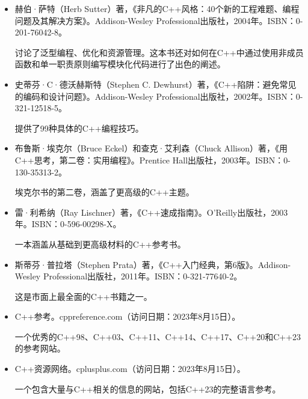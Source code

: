 \begin{itemize}
\item
赫伯·萨特（Herb Sutter）著，《非凡的C++风格：40个新的工程难题、编程问题及其解决方案》。Addison-Wesley Professional出版社，2004年。ISBN：0-201-76042-8。

\hspace*{\fill}

讨论了泛型编程、优化和资源管理。这本书还对如何在C++中通过使用非成员函数和单一职责原则编写模块化代码进行了出色的阐述。

\hspace*{\fill}

\item
史蒂芬·C·德沃赫斯特（Stephen C. Dewhurst）著，《C++陷阱：避免常见的编码和设计问题》。Addison-Wesley Professional出版社，2002年。ISBN：0-321-12518-5。

\hspace*{\fill}

提供了99种具体的C++编程技巧。

\hspace*{\fill}

\item
布鲁斯·埃克尔（Bruce Eckel）和查克·艾利森（Chuck Allison）著，《用C++思考，第二卷：实用编程》。Prentice Hall出版社，2003年。ISBN：0-130-35313-2。

\hspace*{\fill}

埃克尔书的第二卷，涵盖了更高级的C++主题。

\hspace*{\fill}

\item
雷·利希纳（Ray Lischner）著，《C++速成指南》。O'Reilly出版社，2003年。ISBN：0-596-00298-X。

\hspace*{\fill}

一本涵盖从基础到更高级材料的C++参考书。

\hspace*{\fill}

\item
斯蒂芬·普拉塔（Stephen Prata）著，《C++入门经典，第6版》。Addison-Wesley Professional出版社，2011年。ISBN：0-321-77640-2。

\hspace*{\fill}

这是市面上最全面的C++书籍之一。

\hspace*{\fill}

\item
C++参考。cppreference.com（访问日期：2023年8月15日）。

\hspace*{\fill}

一个优秀的C++98、C++03、C++11、C++14、C++17、C++20和C++23的参考网站。

\hspace*{\fill}

\item
C++资源网络。cplusplus.com（访问日期：2023年8月15日）。

\hspace*{\fill}

一个包含大量与C++相关的信息的网站，包括C++23的完整语言参考。
\end{itemize}

